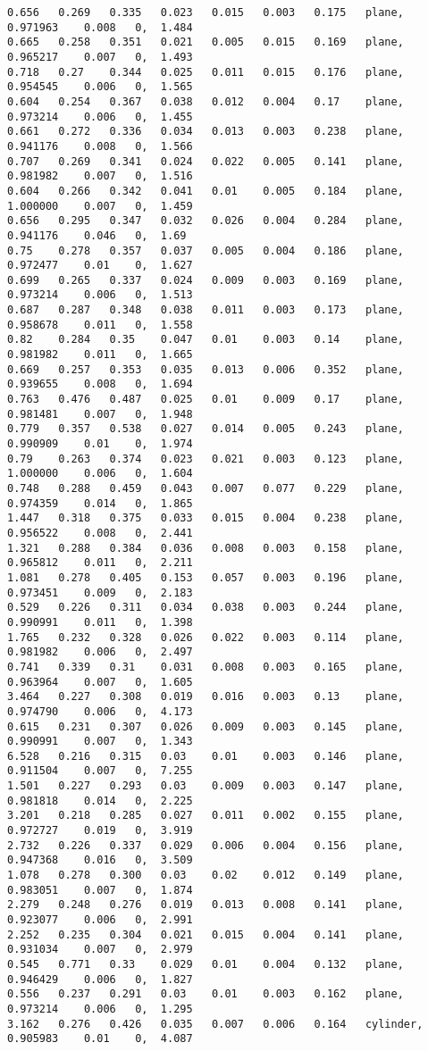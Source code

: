 {\begin{lstlisting}[caption={Datos obtenidos para la prueba del plano usando AE.}]
0.656	0.269	0.335	0.023	0.015	0.003	0.175	plane,  	0.971963	0.008	0, 	1.484
0.665	0.258	0.351	0.021	0.005	0.015	0.169	plane,  	0.965217	0.007	0, 	1.493
0.718	0.27	0.344	0.025	0.011	0.015	0.176	plane,  	0.954545	0.006	0, 	1.565
0.604	0.254	0.367	0.038	0.012	0.004	0.17	plane,  	0.973214	0.006	0, 	1.455
0.661	0.272	0.336	0.034	0.013	0.003	0.238	plane,  	0.941176	0.008	0, 	1.566
0.707	0.269	0.341	0.024	0.022	0.005	0.141	plane,  	0.981982	0.007	0, 	1.516
0.604	0.266	0.342	0.041	0.01	0.005	0.184	plane,   	1.000000	0.007	0, 	1.459
0.656	0.295	0.347	0.032	0.026	0.004	0.284	plane,  	0.941176	0.046	0, 	1.69
0.75	0.278	0.357	0.037	0.005	0.004	0.186	plane,  	0.972477	0.01	0, 	1.627
0.699	0.265	0.337	0.024	0.009	0.003	0.169	plane,  	0.973214	0.006	0, 	1.513
0.687	0.287	0.348	0.038	0.011	0.003	0.173	plane,  	0.958678	0.011	0, 	1.558
0.82	0.284	0.35	0.047	0.01	0.003	0.14	plane,  	0.981982	0.011	0, 	1.665
0.669	0.257	0.353	0.035	0.013	0.006	0.352	plane,  	0.939655	0.008	0, 	1.694
0.763	0.476	0.487	0.025	0.01	0.009	0.17	plane,  	0.981481	0.007	0, 	1.948
0.779	0.357	0.538	0.027	0.014	0.005	0.243	plane,  	0.990909	0.01	0, 	1.974
0.79	0.263	0.374	0.023	0.021	0.003	0.123	plane,   	1.000000	0.006	0, 	1.604
0.748	0.288	0.459	0.043	0.007	0.077	0.229	plane,  	0.974359	0.014	0, 	1.865
1.447	0.318	0.375	0.033	0.015	0.004	0.238	plane,  	0.956522	0.008	0, 	2.441
1.321	0.288	0.384	0.036	0.008	0.003	0.158	plane,  	0.965812	0.011	0, 	2.211
1.081	0.278	0.405	0.153	0.057	0.003	0.196	plane,  	0.973451	0.009	0, 	2.183
0.529	0.226	0.311	0.034	0.038	0.003	0.244	plane,  	0.990991	0.011	0, 	1.398
1.765	0.232	0.328	0.026	0.022	0.003	0.114	plane,  	0.981982	0.006	0, 	2.497
0.741	0.339	0.31	0.031	0.008	0.003	0.165	plane,  	0.963964	0.007	0, 	1.605
3.464	0.227	0.308	0.019	0.016	0.003	0.13	plane,  	0.974790	0.006	0, 	4.173
0.615	0.231	0.307	0.026	0.009	0.003	0.145	plane,  	0.990991	0.007	0, 	1.343
6.528	0.216	0.315	0.03	0.01	0.003	0.146	plane,  	0.911504	0.007	0, 	7.255
1.501	0.227	0.293	0.03	0.009	0.003	0.147	plane,  	0.981818	0.014	0, 	2.225
3.201	0.218	0.285	0.027	0.011	0.002	0.155	plane,  	0.972727	0.019	0, 	3.919
2.732	0.226	0.337	0.029	0.006	0.004	0.156	plane,  	0.947368	0.016	0, 	3.509
1.078	0.278	0.300	0.03	0.02	0.012	0.149	plane,  	0.983051	0.007	0, 	1.874
2.279	0.248	0.276	0.019	0.013	0.008	0.141	plane,  	0.923077	0.006	0, 	2.991
2.252	0.235	0.304	0.021	0.015	0.004	0.141	plane,  	0.931034	0.007	0, 	2.979
0.545	0.771	0.33	0.029	0.01	0.004	0.132	plane,  	0.946429	0.006	0, 	1.827
0.556	0.237	0.291	0.03	0.01	0.003	0.162	plane,  	0.973214	0.006	0, 	1.295
3.162	0.276	0.426	0.035	0.007	0.006	0.164	cylinder, 	0.905983	0.01	0, 	4.087

\end{lstlisting}}
